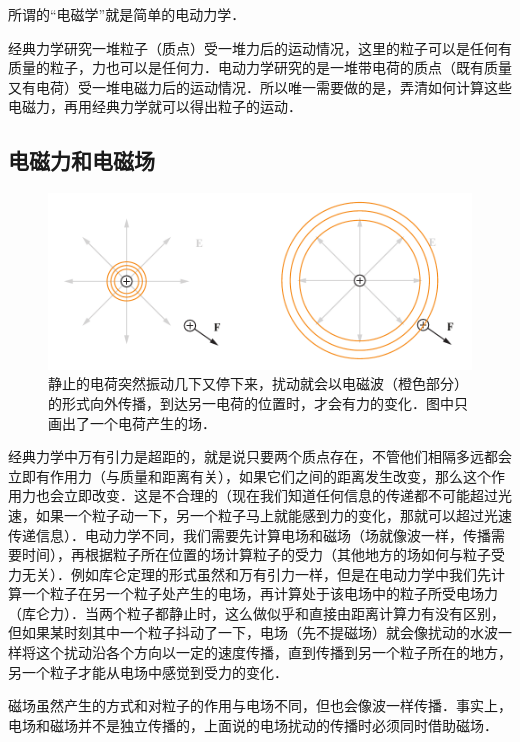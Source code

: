 
所谓的“电磁学”就是简单的电动力学．

经典力学研究一堆粒子（质点）受一堆力后的运动情况，这里的粒子可以是任何有质量的粒子，力也可以是任何力．电动力学研究的是一堆带电荷的质点（既有质量又有电荷）受一堆电磁力后的运动情况．所以唯一需要做的是，弄清如何计算这些电磁力，再用经典力学就可以得出粒子的运动．

\subsection{电磁力和电磁场}

\begin{figure}[ht]
\centering
\includegraphics[width=14cm]{./figures/EM01.pdf}
\caption{静止的电荷突然振动几下又停下来，扰动就会以电磁波（橙色部分）的形式向外传播，到达另一电荷的位置时，才会有力的变化．图中只画出了一个电荷产生的场．} \label{EM0_fig1}
\end{figure}

经典力学中万有引力是超距的，就是说只要两个质点存在，不管他们相隔多远都会立即有作用力（与质量和距离有关），如果它们之间的距离发生改变，那么这个作用力也会立即改变．这是不合理的（现在我们知道任何信息的传递都不可能超过光速，如果一个粒子动一下，另一个粒子马上就能感到力的变化，那就可以超过光速传递信息）．电动力学不同，我们需要先计算电场和磁场（场就像波一样，传播需要时间），再根据粒子所在位置的场计算粒子的受力（其他地方的场如何与粒子受力无关）．例如库仑定理的形式虽然和万有引力一样，但是在电动力学中我们先计算一个粒子在另一个粒子处产生的电场，再计算处于该电场中的粒子所受电场力（库仑力）．当两个粒子都静止时，这么做似乎和直接由距离计算力有没有区别，但如果某时刻其中一个粒子抖动了一下，电场（先不提磁场）就会像扰动的水波一样将这个扰动沿各个方向以一定的速度传播，直到传播到另一个粒子所在的地方，另一个粒子才能从电场中感觉到受力的变化．

磁场虽然产生的方式和对粒子的作用与电场不同，但也会像波一样传播．事实上，电场和磁场并不是独立传播的，上面说的电场扰动的传播时必须同时借助磁场．


